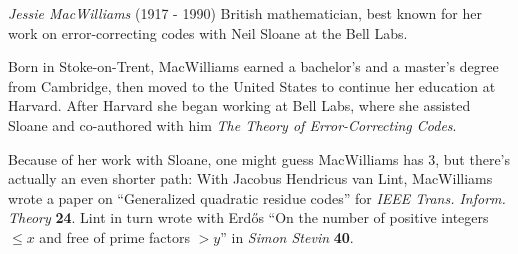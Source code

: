 \documentclass[12pt]{article}
\begin{document}

\emph{Jessie MacWilliams} (1917 - 1990) British mathematician, best known for her work on error-correcting codes with Neil Sloane at the Bell Labs.

Born in Stoke-on-Trent, MacWilliams earned a bachelor's and a master's degree from Cambridge, then moved to the United States to continue her education at Harvard. After Harvard she began working at Bell Labs, where she assisted Sloane and co-authored with him {\it The Theory of Error-Correcting Codes}.

Because of her work with Sloane, one might guess MacWilliams has  3, but there's actually an even shorter path: With Jacobus Hendricus van Lint, MacWilliams wrote a paper on ``Generalized quadratic residue codes'' for {\it IEEE Trans. Inform. Theory} {\bf 24}. Lint in turn wrote with Erd\H{o}s ``On the number of positive integers $\leq x$ and free of prime factors $> y$'' in {\it Simon Stevin} {\bf 40}.
\end{document}

